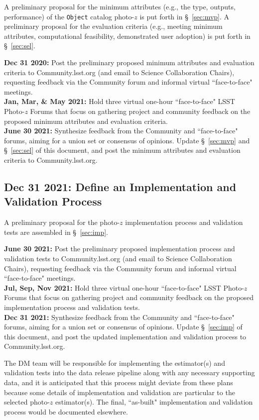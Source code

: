 \documentclass[DM,lsstdraft,toc]{lsstdoc}
\begin{document}
A preliminary proposal for the minimum attributes (e.g., the type, outputs, performance) of the {\tt Object} catalog photo-$z$ is put forth in \S~\ref{sec:mvp}.
A preliminary proposal for the evaluation criteria (e.g., meeting minimum attributes, computational feasibility, demonstrated user adoption) is put forth in \S~\ref{sec:sel}.

{\bf Dec 31 2020:} Post the preliminary proposed minimum attributes and evaluation criteria to Community.lsst.org (and email to Science Collaboration Chairs), requesting feedback via the Community forum and informal virtual ``face-to-face" meetings. \\
{\bf Jan, Mar, \& May 2021:} Hold three virtual one-hour ``face-to-face" LSST Photo-$z$ Forums that focus on gathering project and community feedback on the proposed minimum attributes and evaluation criteria. \\
{\bf June 30 2021:} Synthesize feedback from the Community and ``face-to-face" forums, aiming for a union set or consensus of opinions. Update \S~\ref{sec:mvp} and \S~\ref{sec:sel} of this document, and post the minimum attributes and evaluation criteria to Community.lsst.org.

\subsection{Dec 31 2021: Define an Implementation and Validation Process}\label{ssec:time_imp}

A preliminary proposal for the photo-$z$ implementation process and validation tests are assembled in \S~\ref{sec:imp}.

{\bf June 30 2021:} Post the preliminary proposed implementation process and validation tests to Community.lsst.org (and email to Science Collaboration Chairs), requesting feedback via the Community forum and informal virtual ``face-to-face" meetings. \\
{\bf Jul, Sep, Nov 2021:} Hold three virtual one-hour ``face-to-face" LSST Photo-$z$ Forums that focus on gathering project and community feedback on the proposed implementation process and validation tests. \\
{\bf Dec 31 2021:} Synthesize feedback from the Community and ``face-to-face" forums, aiming for a union set or consensus of opinions. Update \S~\ref{sec:imp} of this document, and post the updated implementation and validation process to Community.lsst.org.

The DM team will be responsible for implementing the estimator(s) and validation tests into the data release pipeline along with any necessary supporting data, and it is anticipated that this process might deviate from these plans because some details of implementation and validation are particular to the selected photo-$z$ estimator(s).
The final, ``as-built" implementation and validation process would be documented elsewhere.
\end{document}
